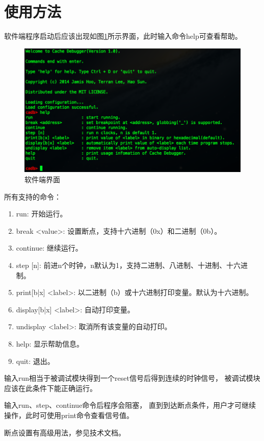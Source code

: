 \section{使用方法}
    软件端程序启动后应该出现如图\ref{client}所示界面，此时输入命令help可查看帮助。

    \begin{figure}[!hbp]
            \caption{软件端界面}\label{client}
            \centering
            \includegraphics[width=\textwidth]{chart/cadb_client}
    \end{figure}

    所有支持的命令：
    \begin{enumerate}
    \item
    run: 开始运行。
    \item
    break <value>: 设置断点，支持十六进制（0x）和二进制（0b）。
    \item
    continue: 继续运行。
    \item
    step [n]: 前进n个时钟，n默认为1，支持二进制、八进制、十进制、十六进制。
    \item
    print[b|x] <label>: 以二进制（b）或十六进制打印变量。默认为十六进制。
    \item
    display[b|x] <label>: 自动打印变量。
    \item
    undisplay <label>: 取消所有该变量的自动打印。
    \item
    help: 显示帮助信息。
    \item
    quit: 退出。
    \end{enumerate}

    输入run相当于被调试模块得到一个reset信号后得到连续的时钟信号，%
    被调试模块应该在此条件下能正确运行。

    输入run、step、continue命令后程序会阻塞，%
    直到到达断点条件，用户才可继续操作，此时可使用print命令查看信号值。

    断点设置有高级用法，参见技术文档。

